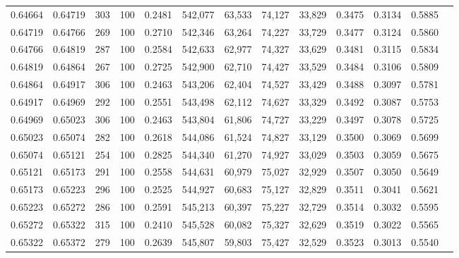 \begin{tabular}{rrrrrrrrrrrrr}
0.64664 & 0.64719 &   303 & 100 &                                     0.2481 & 542,077 &  63,533 &  74,127 &  33,829 & 0.3475 & 0.3134 & 0.5885 \\
0.64719 & 0.64766 &   269 & 100 &                                     0.2710 & 542,346 &  63,264 &  74,227 &  33,729 & 0.3477 & 0.3124 & 0.5860 \\
0.64766 & 0.64819 &   287 & 100 &                                     0.2584 & 542,633 &  62,977 &  74,327 &  33,629 & 0.3481 & 0.3115 & 0.5834 \\
0.64819 & 0.64864 &   267 & 100 &                                     0.2725 & 542,900 &  62,710 &  74,427 &  33,529 & 0.3484 & 0.3106 & 0.5809 \\
0.64864 & 0.64917 &   306 & 100 &                                     0.2463 & 543,206 &  62,404 &  74,527 &  33,429 & 0.3488 & 0.3097 & 0.5781 \\
0.64917 & 0.64969 &   292 & 100 &                                     0.2551 & 543,498 &  62,112 &  74,627 &  33,329 & 0.3492 & 0.3087 & 0.5753 \\
0.64969 & 0.65023 &   306 & 100 &                                     0.2463 & 543,804 &  61,806 &  74,727 &  33,229 & 0.3497 & 0.3078 & 0.5725 \\
0.65023 & 0.65074 &   282 & 100 &                                     0.2618 & 544,086 &  61,524 &  74,827 &  33,129 & 0.3500 & 0.3069 & 0.5699 \\
0.65074 & 0.65121 &   254 & 100 &                                     0.2825 & 544,340 &  61,270 &  74,927 &  33,029 & 0.3503 & 0.3059 & 0.5675 \\
0.65121 & 0.65173 &   291 & 100 &                                     0.2558 & 544,631 &  60,979 &  75,027 &  32,929 & 0.3507 & 0.3050 & 0.5649 \\
0.65173 & 0.65223 &   296 & 100 &                                     0.2525 & 544,927 &  60,683 &  75,127 &  32,829 & 0.3511 & 0.3041 & 0.5621 \\
0.65223 & 0.65272 &   286 & 100 &                                     0.2591 & 545,213 &  60,397 &  75,227 &  32,729 & 0.3514 & 0.3032 & 0.5595 \\
0.65272 & 0.65322 &   315 & 100 &                                     0.2410 & 545,528 &  60,082 &  75,327 &  32,629 & 0.3519 & 0.3022 & 0.5565 \\
0.65322 & 0.65372 &   279 & 100 &                                     0.2639 & 545,807 &  59,803 &  75,427 &  32,529 & 0.3523 & 0.3013 & 0.5540 \\

\end{tabular}
